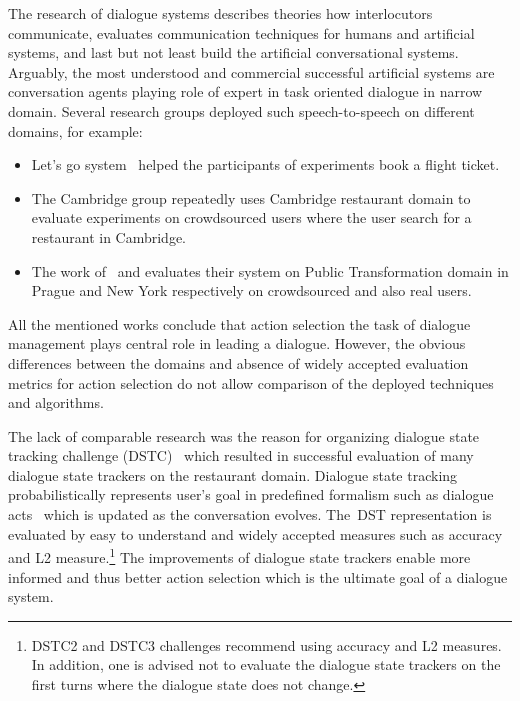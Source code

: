 \documentclass[11pt]{article}
\begin{document}
The research of dialogue systems describes theories how interlocutors communicate, evaluates communication techniques for humans and artificial systems, and last but not least build the artificial conversational systems.
Arguably, the most understood and commercial successful artificial systems are conversation agents playing role of expert in task oriented dialogue in narrow domain.
Several research groups deployed such speech-to-speech on different domains, for example:
\begin{itemize}
    \item Let's go system~\cite{raux_lets_2005} helped the participants of experiments book a flight ticket.
    \item The Cambridge group repeatedly uses Cambridge restaurant domain to evaluate experiments on crowdsourced users where the user search for a restaurant in Cambridge.
    \item The work of~\cite{dusek_sequence2sequence_2016} and \cite{vejman_martin_development_2015} evaluates their system on Public Transformation domain in Prague and New York respectively on crowdsourced and also real users. 
\end{itemize}
All the mentioned works conclude that action selection the task of dialogue management plays central role in leading a dialogue.
However, the obvious differences between the domains and absence of widely accepted evaluation metrics for action selection do not allow comparison of the deployed techniques and algorithms.

The lack of comparable research was the reason for organizing dialogue state tracking challenge (DSTC)~\cite{dstcwilliams} which resulted in successful evaluation of many dialogue state trackers on the restaurant domain.
Dialogue state tracking probabilistically represents user's goal in predefined formalism such as dialogue acts~\cite{dstcwilliams,henderson2014second,hendersonthird} which is updated as the conversation evolves.
The~DST representation is evaluated by easy to understand and widely accepted measures such as accuracy and L2 measure.\footnote{DSTC2 and DSTC3 challenges recommend using accuracy and L2 measures. In addition, one is advised not to evaluate the dialogue state trackers on the first turns where the dialogue state does not change.}
The improvements of dialogue state trackers enable more informed and thus better action selection which is the ultimate goal of a dialogue system.
\end{document}
